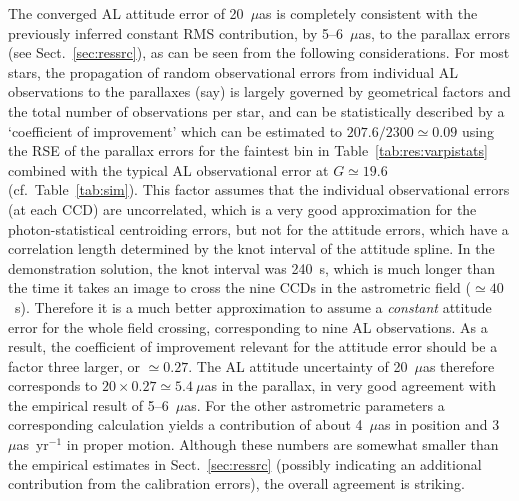 \documentclass[structabstract]{aa}
\begin{document}
The converged AL attitude error of 20~$\mu$as is completely consistent with 
the previously inferred constant RMS contribution, by 5--6~$\mu$as, 
to the parallax errors (see Sect.~\ref{sec:ressrc}), as can
be seen from the following considerations. For most stars, the propagation of 
random observational errors from individual AL observations to the parallaxes 
(say) is largely governed by geometrical factors and the total number of 
observations per star, and can be statistically described by a `coefficient of
improvement' which can be estimated to $207.6/2300\simeq 0.09$
using the RSE of the parallax errors for the faintest bin in Table~\ref{tab:res:varpistats}
combined with the typical AL observational error at $G\simeq 19.6$ 
(cf.\ Table~\ref{tab:sim}). This factor assumes that the individual observational
errors (at each CCD) are uncorrelated, which is a very good approximation for
the photon-statistical centroiding errors, but not for the attitude errors, which 
have a correlation length determined by the knot interval of the attitude spline.
In the demonstration solution, the knot interval was 240~s, which is much longer
than the time it takes an image to cross the nine CCDs in the astrometric field
($\simeq 40$~s). Therefore it is a much better approximation to assume a 
\emph{constant} attitude error for the whole field crossing, corresponding to 
nine AL observations. As a result, the coefficient of improvement relevant for
the attitude error should be a factor three larger, or $\simeq 0.27$. The 
AL attitude uncertainty of 20~$\mu$as therefore corresponds to 
$20\times 0.27\simeq 5.4~\mu$as in the parallax, in very good agreement 
with the empirical result of 5--6~$\mu$as. For the other astrometric parameters a corresponding 
calculation yields a contribution of about 4~$\mu$as in position and 
3~$\mu$as~yr$^{-1}$ in proper motion. Although these numbers are 
somewhat smaller than the empirical estimates in Sect.~\ref{sec:ressrc} 
(possibly indicating an additional contribution from the calibration errors), 
the overall agreement is striking.
\end{document}
